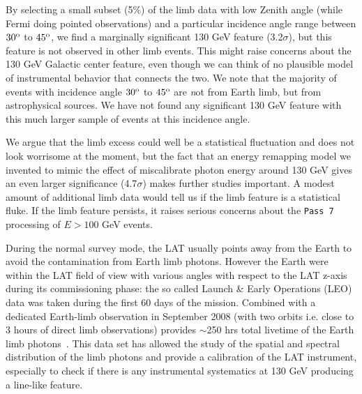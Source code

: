 \documentclass[aps,twocolumn,prd,superscriptaddress,showpacs,nofootinbib,fixfloat]{revtex4}
\newcommand{\degree}{^{\rm o}}
\begin{document}
By selecting a small subset (5\%) of the limb data with low
Zenith angle (while Fermi doing pointed observations) and a
particular incidence angle range between $30\degree$ to
$45\degree$, we find a marginally significant 130 GeV
feature (3.2$\sigma$), but this feature is not observed in
other limb events.  This might raise concerns about the 130
GeV Galactic center feature, even though we can think of no
plausible model of instrumental behavior that connects the
two. We note that the majority of events with incidence
angle $30\degree$ to $45\degree$ are {\emph not} from Earth
limb, but from astrophysical sources. We have not found any
significant 130 GeV feature with this much larger sample of
events at this incidence angle.

We argue that the limb excess could well be a statistical
fluctuation and does not look worrisome at the moment, but
the fact that an energy remapping model we invented to mimic
the effect of miscalibrate photon energy around 130 GeV
gives an even larger significance (4.7$\sigma$) makes
further studies important. A modest amount of additional
limb data would tell us if the limb feature is a statistical
fluke.  If the limb feature persists, it raises serious
concerns about the \texttt{Pass 7} processing of $E > 100$ GeV
events.

During the normal survey mode, the LAT usually points away
from the Earth to avoid the contamination from Earth limb
photons. However the Earth were within the LAT field of view
with various angles with respect to the LAT z-axis during
its commissioning phase: the so called Launch \& Early
Operations (LEO) data was taken during the first 60 days of
the mission. Combined with a dedicated Earth-limb
observation in September 2008 (with two orbits i.e. close to
3 hours of direct limb observations) provides $\sim$250 hrs
total livetime of the Earth limb
photons~\cite{FermiLimb}. This data set has allowed the
study of the spatial and spectral distribution of the limb
photons and provide a calibration of the LAT instrument,
especially to check if there is any instrumental systematics
at 130 GeV producing a line-like feature.
\end{document}
